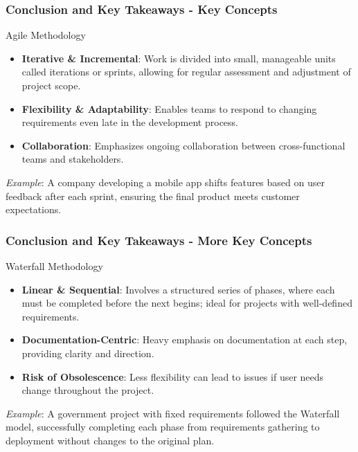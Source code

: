 \documentclass{beamer}
\begin{document}
\begin{frame}[fragile]
    \frametitle{Conclusion and Key Takeaways - Key Concepts}
    \begin{block}{Agile Methodology}
        \begin{itemize}
            \item \textbf{Iterative \& Incremental}: Work is divided into small, manageable units called iterations or sprints, allowing for regular assessment and adjustment of project scope.
            \item \textbf{Flexibility \& Adaptability}: Enables teams to respond to changing requirements even late in the development process.
            \item \textbf{Collaboration}: Emphasizes ongoing collaboration between cross-functional teams and stakeholders.
        \end{itemize}
        \textit{Example}: A company developing a mobile app shifts features based on user feedback after each sprint, ensuring the final product meets customer expectations.
    \end{block}
\end{frame}

\begin{frame}[fragile]
    \frametitle{Conclusion and Key Takeaways - More Key Concepts}
    \begin{block}{Waterfall Methodology}
        \begin{itemize}
            \item \textbf{Linear \& Sequential}: Involves a structured series of phases, where each must be completed before the next begins; ideal for projects with well-defined requirements.
            \item \textbf{Documentation-Centric}: Heavy emphasis on documentation at each step, providing clarity and direction.
            \item \textbf{Risk of Obsolescence}: Less flexibility can lead to issues if user needs change throughout the project.
        \end{itemize}
        \textit{Example}: A government project with fixed requirements followed the Waterfall model, successfully completing each phase from requirements gathering to deployment without changes to the original plan.
    \end{block}
\end{frame}
\end{document}
